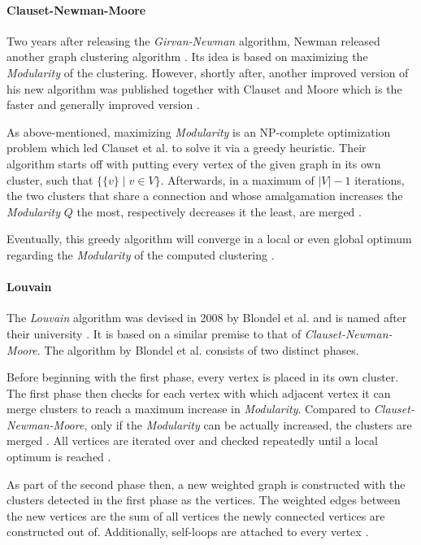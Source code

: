 \documentclass[12pt,a4paper]{report}
\begin{document}
\paragraph{Clauset-Newman-Moore \cite{clauset2004modularity}}
Two years after releasing the \textit{Girvan-Newman} algorithm, Newman
released another graph clustering algorithm \cite{newman2004fast}.
Its idea is based on maximizing the \textit{Modularity} of the clustering.
However, shortly after, another improved version of his new algorithm
was published together with Clauset and Moore which is the
faster and generally improved version \cite{clauset2004modularity}.

As above-mentioned, maximizing \textit{Modularity} is an NP-complete
optimization problem which led Clauset et al. to solve it via a greedy heuristic.
Their algorithm starts off with putting every vertex of the given graph in its
own cluster, such that \(\{\{v\} \mid v \in V\}\).
Afterwards, in a maximum of \(\vert V \vert - 1\) iterations, the two clusters
that share a connection and whose amalgamation increases the \textit{Modularity}
\(Q\) the most, respectively decreases it the least, are merged
\cite{clauset2004modularity}.

Eventually, this greedy algorithm will converge in a local or even global
optimum regarding the \textit{Modularity} of the computed clustering
\cite{clauset2004modularity}.

\paragraph{Louvain \cite{blondel2008modularity}}
The \textit{Louvain} algorithm was devised in 2008 by Blondel et al. and is
named after their university \cite{blondel2008modularity}.
It is based on a similar premise to that of \textit{Clauset-Newman-Moore}.
The algorithm by Blondel et al. consists of two distinct phases.

Before beginning with the first phase, every vertex is placed in its own cluster.
The first phase then checks for each vertex with which adjacent vertex it can
merge clusters to reach a maximum increase in \textit{Modularity}.
Compared to \textit{Clauset-Newman-Moore}, only if the \textit{Modularity}
can be actually increased, the clusters are merged \cite{blondel2008modularity}.
All vertices are iterated over and checked repeatedly until a local optimum
is reached \cite{blondel2008modularity}.

As part of the second phase then, a new weighted graph is constructed with
the clusters detected in the first phase as the vertices.
The weighted edges between the new vertices are the sum of all vertices
the newly connected vertices are constructed out of.
Additionally, self-loops are attached to every vertex \cite{blondel2008modularity}.
\end{document}
